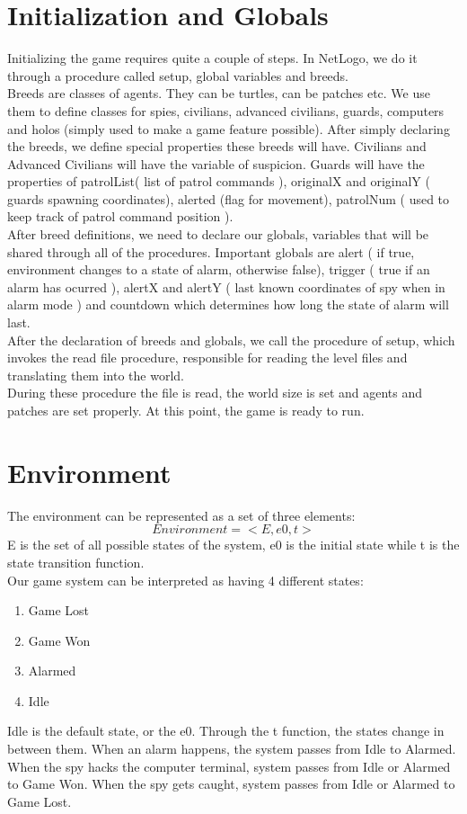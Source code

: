 \documentclass[12pt]{article}
\begin{document}
\section{Initialization and Globals}
Initializing the game requires quite a couple of steps. In NetLogo, we do it through a procedure called setup, global variables and breeds.\\
\vspace{0.1cm}
Breeds are classes of agents. They can be turtles, can be patches etc. We use them to define classes for spies, civilians, advanced civilians, guards, computers and holos (simply used to make a game feature possible). After simply declaring the breeds, we define special properties these breeds will have. Civilians and Advanced Civilians will have the variable of suspicion. Guards will have the properties of patrolList( list of patrol commands ), originalX and originalY ( guards spawning coordinates), alerted (flag for movement), patrolNum ( used to keep track of patrol command position ).\\
\vspace{0.1cm}
After breed definitions, we need to declare our globals, variables that will be shared through all of the procedures. Important globals are alert ( if true, environment changes to a state of alarm, otherwise false), trigger ( true if an alarm has ocurred ), alertX and alertY ( last known coordinates of spy when in alarm mode ) and countdown which determines how long the state of alarm will last.\\
\vspace{0.1cm}
After the declaration of breeds and globals, we call the procedure of setup, which invokes the read file procedure, responsible for reading the level files and translating them into the world.\\
\vspace{0.1cm}
During these procedure the file is read, the world size is set and agents and patches are set properly. At this point, the game is ready to run.
\newpage
\section{Environment}
The environment can be represented as a set of three elements:
$$ Environment = <E,e0,t> $$
E is the set of all possible states of the system, e0 is the initial state while t is the state transition function.\\
Our game system can be interpreted as having 4 different states:
\begin{enumerate}
\item Game Lost
\item Game Won
\item Alarmed
\item Idle
\end{enumerate}
Idle is the default state, or the e0. Through the t function, the states change in between them. When an alarm happens, the system passes from Idle to Alarmed. When the spy hacks the computer terminal, system passes from Idle or Alarmed to Game Won. When the spy gets caught,  system passes from Idle or Alarmed to Game Lost.
\end{document}
